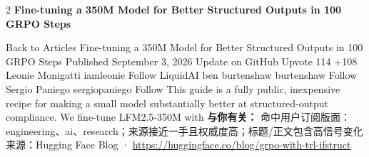 \documentclass[10.5pt]{ctexart}
\begin{document}
\begin{multicols}{2}
{\large\bfseries Fine-tuning a 350M Model for Better Structured Outputs in 100 GRPO Steps}\par
Back to Articles Fine-tuning a 350M Model for Better Structured Outputs in 100 GRPO Steps Published September 3, 2026 Update on GitHub Upvote 114 +108 Leonie Monigatti iamleonie Follow LiquidAI ben burtenshaw burtenshaw Follow Sergio Paniego sergiopaniego Follow This guide is a fully public, inexpensive recipe for making a small model substantially better at structured-output compliance. We fine-tune LFM2.5-350M with
\textbf{与你有关：} 命中用户订阅版面：engineering、ai、research；来源接近一手且权威度高；标题/正文包含高信号变化
{\footnotesize\color{ormuted} 来源：Hugging Face Blog · \url{https://huggingface.co/blog/grpo-with-trl-ifstruct}}
\end{multicols}
\end{document}

